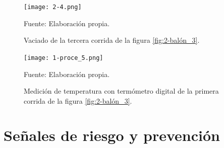\documentclass[12pt,letterpaper]{exam}
\begin{document}
\begin{multicols}{2}
\begin{figure}[H]
\centering
\texttt{[image: 2-4.png]}
\caption{Vaciado de la tercera corrida de la figura \ref{fig:2-balón_3}.}
\begin{center}
Fuente: Elaboración propia.
\end{center}
\label{fig:2-vaciado_3}
\end{figure}


\begin{figure}[H]
\centering
\texttt{[image: 1-proce\_5.png]}
\caption{Medición de temperatura con termómetro digital de la primera corrida de la figura \ref{fig:2-balón_3}.}
\begin{center}
Fuente: Elaboración propia.
\end{center}
\label{fig:2-Termómetro_3}
\end{figure}


\end{multicols}


\clearpage

\section{Señales de riesgo y prevención}
\end{document}
